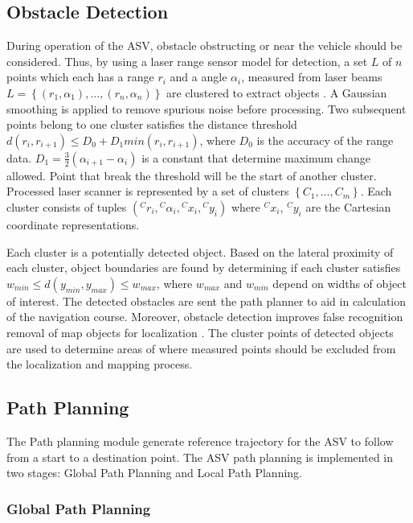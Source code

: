 \documentclass[10 pt,a4paper,conference]{IEEEtran}
\begin{document}
\subsection{Obstacle Detection}\label{obstacle-detection}

During operation of the ASV, obstacle obstructing or near the vehicle
should be considered. Thus, by using a laser range sensor model for
detection, a set \(L\) of \(n\) points which each has a range \(r_{i}\)
and a angle \(\alpha_{i}\), measured from laser beams
\(L=\left\{(r_{1},\alpha_{1}),...,(r_{n},\alpha_{n})\right\}\) are
clustered to extract objects \citep{Juric-Kavelj2008_407}. A Gaussian
smoothing is applied to remove spurious noise before processing. Two
subsequent points belong to one cluster satisfies the distance threshold
\(d(r_{i},r_{i+1}) \leq D_{0}+D_{1}min(r_{i},r_{i+1})\), where \(D_{0}\)
is the accuracy of the range data.
\(D_{1} = \frac{3}{2}(\alpha_{i+1}-\alpha_{i})\) is a constant that
determine maximum change allowed. Point that break the threshold will be
the start of another cluster. Processed laser scanner is represented by
a set of clusters \(\left\{ C_{1},...,C_{m} \right\}\). Each cluster
consists of tuples
\(({}^{C}r_{i},{}^{C}\alpha_{i},{}^{C}x_{i},{}^{C}y_{i})\) where
\({}^{C}x_{i}\), \({}^{C}y_{i}\) are the Cartesian coordinate
representations.

Each cluster is a potentially detected object. Based on the lateral
proximity of each cluster, object boundaries are found by determining if
each cluster satisfies \(w_{min} \leq d(y_{min},y_{max}) \leq w_{max}\),
where \(w_{max}\) and \(w_{min}\) depend on widths of object of
interest. The detected obstacles are sent the path planner to aid in
calculation of the navigation course. Moreover, obstacle detection
improves false recognition removal of map objects for localization
\citep{5164269}. The cluster points of detected objects are used to
determine areas of where measured points should be excluded from the
localization and mapping process.

\subsection{Path Planning}\label{path-planning}

The Path planning module generate reference trajectory for the ASV to
follow from a start to a destination point. The ASV path planning is
implemented in two stages: Global Path Planning and Local Path Planning.

\subsubsection{Global Path Planning}\label{global-path-planning}
\end{document}

